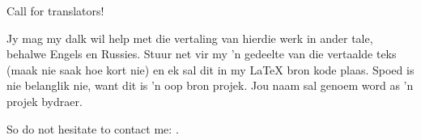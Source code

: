 \vspace*{\fill}

\Huge Call for translators!

\normalsize

\bigskip
\bigskip
\bigskip

Jy mag my dalk wil help met die vertaling van hierdie werk in ander
tale, behalwe Engels en Russies. Stuur net vir my 'n gedeelte van die
vertaalde teks (maak nie saak hoe kort nie) en ek sal dit in my LaTeX
bron kode plaas. Spoed is nie belanglik nie, want dit is 'n oop bron
projek. Jou naam sal genoem word as 'n projek bydraer.

So do not hesitate to contact me: \GTT{\EMAILS}.

\vspace*{\fill}
\vfill
